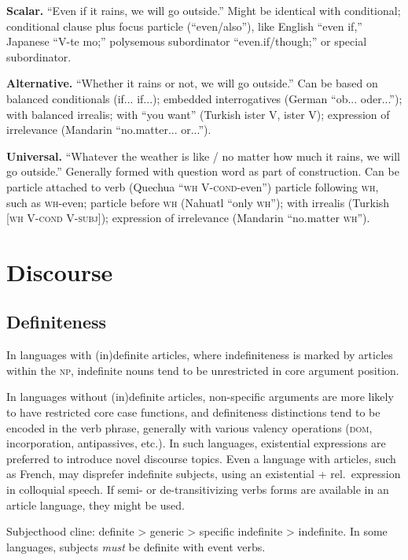 \documentclass[11pt]{article}
\newcommand{\I}[1]{\textsc{#1}}   %
\begin{document}
\textbf{Scalar.} ``Even if it rains, we will go outside.''  Might be
identical with conditional; conditional clause plus focus particle
(``even/also''), like English ``even if,'' Japanese ``V-te mo;''
polysemous subordinator ``even.if/though;'' or special subordinator.

\textbf{Alternative.} ``Whether it rains or not, we will go outside.''
Can be based on balanced conditionals (if... if...); embedded
interrogatives (German ``ob... oder...''); with balanced irrealis;
with ``you want'' (Turkish ister V, ister V); expression of
irrelevance (Mandarin ``no.matter... or...'').

\textbf{Universal.} ``Whatever the weather is like / no matter how much
it rains, we will go outside.''  Generally formed with question word
as part of construction.  Can be particle attached to verb (Quechua
``\I{wh} V-\I{cond}-even'') particle following \I{wh}, such as
\I{wh}-even; particle before \I{wh} (Nahuatl ``only \I{wh}''); with
irrealis (Turkish [\I{wh V-cond V-subj}]); expression of irrelevance
(Mandarin ``no.matter \I{wh}'').


\section{Discourse}

\subsection{Definiteness}
In languages with (in)definite articles, where indefiniteness is
marked by articles within the \I{np}, indefinite nouns tend to be
unrestricted in core argument position.

In languages without (in)definite articles, non-specific arguments are
more likely to have restricted core case functions, and definiteness
distinctions tend to be encoded in the verb phrase, generally with
various valency operations (\I{dom}, incorporation, antipassives,
etc.).  In such languages, existential expressions are preferred to
introduce novel discourse topics.  Even a language with articles, such
as French, may disprefer indefinite subjects, using an existential +
rel.\ expression in colloquial speech.  If semi- or de-transitivizing
verbs forms are available in an article language, they might be used.

Subjecthood cline: definite > generic > specific indefinite >
indefinite.  In some languages, subjects \textit{must} be definite
with event verbs.
\end{document}
